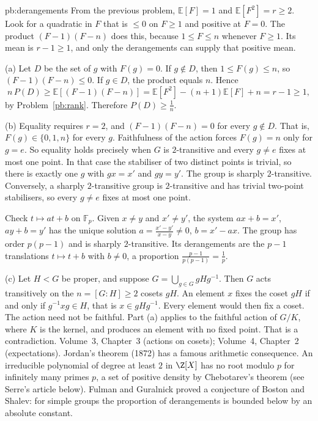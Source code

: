 \begin{solution}{pb:derangements}
\idea From the previous problem, $\mathbb E[F]=1$ and $\mathbb E[F^2]=r\ge2$. Look for a quadratic in $F$ that is $\le0$ on $F\ge1$ and
positive at $F=0$. The product $(F-1)(F-n)$ does this, because $1\le F\le n$ whenever $F\ge1$. Its mean is $r-1\ge1$, and only the
derangements can supply that positive mean.

\writeup (a) Let $D$ be the set of $g$ with $F(g)=0$. If $g\notin D$, then $1\le F(g)\le n$, so $(F-1)(F-n)\le0$. If $g\in D$, the product equals $n$.
Hence
\[
n\,P(D)\ge\mathbb E[(F-1)(F-n)]=\mathbb E[F^2]-(n+1)\mathbb E[F]+n=r-1\ge1,
\]
by Problem~\ref{pb:rank}. Therefore $P(D)\ge\frac1n$.

(b) Equality requires $r=2$, and $(F-1)(F-n)=0$ for every $g\notin D$. That is, $F(g)\in\{0,1,n\}$ for every $g$. Faithfulness of the action
forces $F(g)=n$ only for $g=e$. So equality holds precisely when $G$ is $2$-transitive and every $g\ne e$ fixes at most one
point. In that case the stabiliser of two distinct points is trivial, so there is exactly one $g$ with $gx=x'$ and $gy=y'$. The group is sharply
$2$-transitive. Conversely, a sharply $2$-transitive group is $2$-transitive and has trivial two-point stabilisers, so every $g\ne e$
fixes at most one point.

Check $t\mapsto at+b$ on $\mathbb F_p$. Given $x\ne y$ and $x'\ne y'$, the system $ax+b=x'$, $ay+b=y'$ has the unique solution
$a=\frac{x'-y'}{x-y}\ne0$, $b=x'-ax$. The group has order $p(p-1)$ and is sharply $2$-transitive. Its derangements are the
$p-1$ translations $t\mapsto t+b$ with $b\ne0$, a proportion $\frac{p-1}{p(p-1)}=\frac1p$.

(c) Let $H<G$ be proper, and suppose $G=\bigcup_{g\in G}gHg^{-1}$. Then $G$ acts transitively on the
$n=[G:H]\ge2$ cosets $gH$. An element $x$ fixes the coset $gH$ if and only if $g^{-1}xg\in H$, that is $x\in gHg^{-1}$. Every element would then fix a
coset. The action need not be faithful. Part (a) applies to the faithful action of $G/K$, where $K$ is the kernel, and produces an element
with no fixed point. That is a contradiction.
\tools Volume~3, Chapter~3 (actions on cosets); Volume~4, Chapter~2 (expectations).
\leads Jordan's theorem (1872) has a famous arithmetic consequence. An irreducible polynomial of degree at least $2$ in
$\Z[X]$ has no root modulo $p$ for infinitely many primes $p$, a set of positive density by Chebotarev's theorem (see Serre's
article below). Fulman and Guralnick proved a conjecture of Boston and Shalev: for simple groups the proportion of
derangements is bounded below by an absolute constant.
\end{solution}

